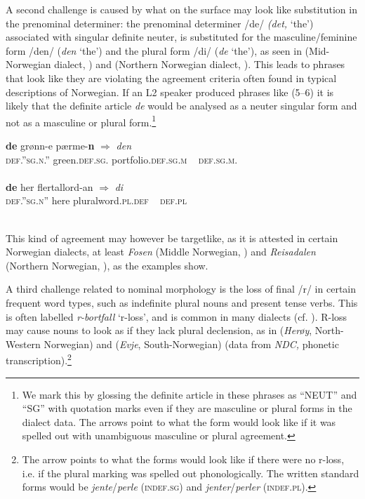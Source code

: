 \documentclass[output=paper,colorlinks,citecolor=brown,modfonts,nonflat]{../langscibook}
\begin{document}
A second challenge is caused by what on the surface may look like substitution in the prenominal determiner: the prenominal determiner /de/ \textit{(det,} ‘the’) associated with singular definite neuter, is substituted for the masculine/feminine form /den/ (\textit{den} ‘the’) and the plural form /di/ (\textit{de} ‘the’), as seen in  (Mid-Norwegian dialect, \citealt[46]{EideEtAl2017}) and  (Northern Norwegian dialect, \citealt{Sollid2014}). This leads to phrases that look like they are violating the agreement criteria often found in typical descriptions of Norwegian. If an L2 speaker produced phrases like (5–6) it is likely that the definite article \textit{de} would be analysed as a neuter singular form and not as a masculine  or plural  form.\footnote{{We mark this by glossing the definite article in these phrases as “NEUT” and “SG” with quotation marks even if they are masculine or plural forms in the dialect data. The arrows point to what the form would look like if it was spelled out with unambiguous masculine or plural agreement.}}



\ea%
    \label{ex:emilsen:5}
\gll \textbf{de} grønn-e pærme-\textbf{n} ${\Rightarrow}$ \textit{den}\\
 \textsc{def}.”\textsc{sg}.\textsc{n}.” green.\textsc{def}.\textsc{sg}. portfolio.\textsc{def}.\textsc{sg}.{\textsc{m}} ~ \textsc{def}.\textsc{sg}.\textsc{m}.\\
  \\

\ex%
    \label{ex:emilsen:6}
\gll \textbf{de} her flertallord-an ${\Rightarrow}$ \textit{di}\\
 \textsc{def}.”\textsc{sg}.\textsc{n}” here pluralword.\textsc{pl.def} ~ \textsc{def.pl}\\
  \\
\z


This kind of agreement may however be targetlike, as it is attested in certain Norwegian dialects, at least \textit{Fosen} (Middle Norwegian, ) and \textit{Reisadalen} (Northern Norwegian, ), as the examples show.

A third challenge related to nominal morphology is the loss of final /r/ in certain frequent word types, such as indefinite plural nouns and present tense verbs. This is often labelled \textit{r-bortfall} ‘r-loss’, and is common in many dialects (cf. \citealt[53]{MæhlumRøyneland2012}). R-loss may cause nouns to look as if they lack plural declension, as in  (\textit{Herøy}, North-Western Norwegian) and  (\textit{Evje}, South-Norwegian) (data from \textit{NDC,} phonetic transcription).\footnote{{The arrow points to what the forms would look like if there were no r-loss, i.e. if the plural marking was spelled out phonologically. The written standard forms would be} {\textit{jente}}{/}{\textit{perle}} {(\textsc{indef.sg}) and} {\textit{jenter}}{/}{\textit{perler}} {(\textsc{indef.pl}).}}
\end{document}
